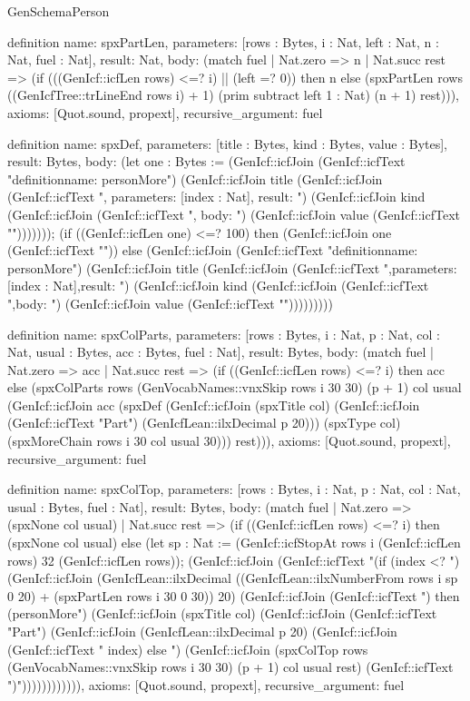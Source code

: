 \begin{lexlean}{GenSchemaPerson}
\begin{semanticmodule}
{definition{
  name: spxPartLen,
  parameters: [rows : Bytes, i : Nat, left : Nat, n : Nat, fuel : Nat],
  result: Nat,
  body: (match fuel
    | Nat.zero => n
    | Nat.succ rest => (if (((GenIcf::icfLen rows) <=? i) || (left =? 0)) then n else (spxPartLen rows ((GenIcfTree::trLineEnd rows i) + 1) (prim subtract left 1 : Nat) (n + 1) rest))),
  axioms: [Quot.sound, propext],
  recursive_argument: fuel
}

definition{
  name: spxDef,
  parameters: [title : Bytes, kind : Bytes, value : Bytes],
  result: Bytes,
  body: (let one : Bytes := (GenIcf::icfJoin (GenIcf::icfText "definition{name: personMore") (GenIcf::icfJoin title (GenIcf::icfJoin (GenIcf::icfText ", parameters: [index : Nat], result: ") (GenIcf::icfJoin kind (GenIcf::icfJoin (GenIcf::icfText ", body: ") (GenIcf::icfJoin value (GenIcf::icfText "}"))))))); (if ((GenIcf::icfLen one) <=? 100) then (GenIcf::icfJoin one (GenIcf::icfText "\n\n")) else (GenIcf::icfJoin (GenIcf::icfText "definition{\n  name: personMore") (GenIcf::icfJoin title (GenIcf::icfJoin (GenIcf::icfText ",\n  parameters: [index : Nat],\n  result: ") (GenIcf::icfJoin kind (GenIcf::icfJoin (GenIcf::icfText ",\n  body: ") (GenIcf::icfJoin value (GenIcf::icfText "\n}\n\n")))))))))
}

definition{
  name: spxColParts,
  parameters: [rows : Bytes, i : Nat, p : Nat, col : Nat, usual : Bytes, acc : Bytes, fuel : Nat],
  result: Bytes,
  body: (match fuel
    | Nat.zero => acc
    | Nat.succ rest => (if ((GenIcf::icfLen rows) <=? i) then acc else (spxColParts rows (GenVocabNames::vnxSkip rows i 30 30) (p + 1) col usual (GenIcf::icfJoin acc (spxDef (GenIcf::icfJoin (spxTitle col) (GenIcf::icfJoin (GenIcf::icfText "Part") (GenIcfLean::ilxDecimal p 20))) (spxType col) (spxMoreChain rows i 30 col usual 30))) rest))),
  axioms: [Quot.sound, propext],
  recursive_argument: fuel
}

definition{
  name: spxColTop,
  parameters: [rows : Bytes, i : Nat, p : Nat, col : Nat, usual : Bytes, fuel : Nat],
  result: Bytes,
  body: (match fuel
    | Nat.zero => (spxNone col usual)
    | Nat.succ rest => (if ((GenIcf::icfLen rows) <=? i) then (spxNone col usual) else (let sp : Nat := (GenIcf::icfStopAt rows i (GenIcf::icfLen rows) 32 (GenIcf::icfLen rows)); (GenIcf::icfJoin (GenIcf::icfText "(if (index <? ") (GenIcf::icfJoin (GenIcfLean::ilxDecimal ((GenIcfLean::ilxNumberFrom rows i sp 0 20) + (spxPartLen rows i 30 0 30)) 20) (GenIcf::icfJoin (GenIcf::icfText ") then (personMore") (GenIcf::icfJoin (spxTitle col) (GenIcf::icfJoin (GenIcf::icfText "Part") (GenIcf::icfJoin (GenIcfLean::ilxDecimal p 20) (GenIcf::icfJoin (GenIcf::icfText " index) else ") (GenIcf::icfJoin (spxColTop rows (GenVocabNames::vnxSkip rows i 30 30) (p + 1) col usual rest) (GenIcf::icfText ")")))))))))))),
  axioms: [Quot.sound, propext],
  recursive_argument: fuel
}

}
\end{semanticmodule}
\end{lexlean}
